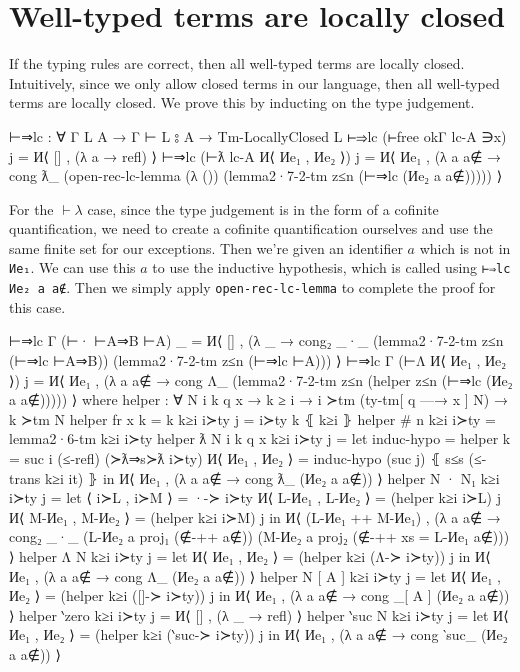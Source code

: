 \documentclass[logo,bsc,singlespacing,parskip,online]{infthesis}
\begin{document}
\section{Well-typed terms are locally closed}
If the typing rules are correct, then all well-typed terms are locally closed. Intuitively, since we
only allow closed terms in our language, then all well-typed terms are locally closed. We prove this by inducting on the type judgement.
\begin{code}
  ⊢⇒lc : ∀ {Γ L A} → Γ ⊢ L ⦂ A → Tm-LocallyClosed L
  ⊢⇒lc (⊢free okΓ lc-A ∋x) j = И⟨ [] , (λ a → refl) ⟩
  ⊢⇒lc (⊢ƛ lc-A И⟨ Иe₁ , Иe₂ ⟩) j = И⟨ Иe₁ , (λ a {a∉} → cong ƛ_
    (open-rec-lc-lemma (λ ())
      (lemma2·7-2-tm z≤n (⊢⇒lc (Иe₂ a {a∉}))))) ⟩
\end{code}
For the $\vdash\lambda$ case, since the type judgement is in the form of a cofinite quantification,
we need to create a cofinite quantification ourselves and use the same finite set for our
exceptions. Then we're given an identifier $a$ which is not in \texttt{Иe₁}. We can use this $a$ to
use the inductive hypothesis, which is called using \texttt{⊢⇒lc Иe₂ a {a∉}}. Then we simply apply
\texttt{open-rec-lc-lemma} to complete the proof for this case.
\begin{code}
  ⊢⇒lc {Γ} (⊢· ⊢A⇒B ⊢A) _ = И⟨ [] , (λ _ → cong₂ _·_
    (lemma2·7-2-tm z≤n (⊢⇒lc ⊢A⇒B))
    (lemma2·7-2-tm z≤n (⊢⇒lc ⊢A))) ⟩
  ⊢⇒lc {Γ} (⊢Λ И⟨ Иe₁ , Иe₂ ⟩) j =
    И⟨ Иe₁ , (λ a {a∉} →
      cong Λ_ (lemma2·7-2-tm z≤n
        (helper z≤n (⊢⇒lc (Иe₂ a {a∉}))))) ⟩
    where
      helper : ∀ {N i k q x} → k ≥ i → i ≻tm (ty-tm[ q —→ x ] N)
        → k ≻tm N
      helper {fr x} {k = k} k≥i i≻ty j = i≻ty k ⦃ k≥i ⦄
      helper {# n} k≥i i≻ty = lemma2·6-tm k≥i i≻ty
      helper {ƛ N} {i} {k} {q} {x} k≥i i≻ty j =
        let induc-hypo = helper {k = suc i} (≤-refl) (≻ƛ⇒s≻ƛ i≻ty)
            И⟨ Иe₁ , Иe₂ ⟩ = induc-hypo (suc j) ⦃ s≤s (≤-trans k≥i it) ⦄
        in И⟨ Иe₁ , (λ a {a∉} → cong ƛ_ (Иe₂ a {a∉})) ⟩
      helper {N · N₁} k≥i i≻ty j =
        let ⟨ i≻L  , i≻M ⟩ = ·-≻ i≻ty
            И⟨ L-Иe₁ , L-Иe₂ ⟩ = (helper k≥i i≻L) j
            И⟨ M-Иe₁ , M-Иe₂ ⟩ = (helper k≥i i≻M) j
          in И⟨ (L-Иe₁ ++ M-Иe₁) , (λ a {a∉} → cong₂ _·_
            (L-Иe₂ a {proj₁ (∉-++ a∉)})
            (M-Иe₂ a {proj₂ (∉-++ {xs = L-Иe₁} a∉)})) ⟩
      helper {Λ N} k≥i i≻ty j =
        let И⟨ Иe₁ , Иe₂ ⟩ = (helper k≥i (Λ-≻ i≻ty)) j
        in И⟨ Иe₁ , (λ a {a∉} → cong Λ_ (Иe₂ a {a∉})) ⟩
      helper {N [ A ]} k≥i i≻ty j =
        let И⟨ Иe₁ , Иe₂ ⟩ = (helper k≥i ([]-≻ i≻ty)) j
        in И⟨ Иe₁ , (λ a {a∉} → cong _[ A ] (Иe₂ a {a∉})) ⟩
      helper {‵zero} k≥i i≻ty j = И⟨ [] , (λ _ → refl) ⟩
      helper {‵suc N} k≥i i≻ty j =
        let И⟨ Иe₁ , Иe₂ ⟩ = (helper k≥i (‵suc-≻ i≻ty)) j
        in И⟨ Иe₁ , (λ a {a∉} → cong ‵suc_ (Иe₂ a {a∉})) ⟩
\end{code}
\end{document}
